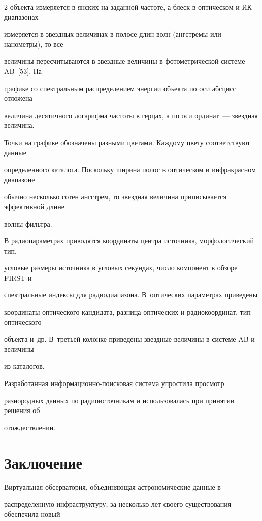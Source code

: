 \begin{multicols}{2}
объекта измеряется в янских на заданной частоте, а блеск в оптическом и ИК диа\-па\-зо\-нах 

измеряется в звездных величинах в полосе длин волн (ангстремы или нанометры), то все 

величины пересчитываются в звездные величины в фотометрической системе AB~[53]. На 

графике со спектральным распределением энергии объекта по оси абсцисс отложена 

величина десятичного логарифма частоты в герцах, а по оси ординат~--- звездная величина. 

Точки на графике обозначены разными цветами. Каждому цвету соответствуют данные 

определенного каталога. Поскольку ширина полос в оптическом и инфракрасном диапазоне 

обычно несколько сотен ангстрем, то звездная величина приписывается эффективной длине 

волны фильтра. 

      

      В радиопараметрах приводятся координаты центра источника, морфологический тип, 

угловые размеры источника в угловых секундах, число компонент в обзоре FIRST и 

спектральные индексы для радиодиапазона. В~оптических параметрах приведены 

координаты оптического кандидата, разница оптических и радиокоординат, тип оптического 

объекта и~др. В~третьей колонке приведены звездные величины в сис\-те\-ме AB и величины 

из каталогов. 

      

      Разработанная ин\-фор\-ма\-ци\-он\-но-по\-иско\-вая сис\-те\-ма упростила просмотр 

разнородных данных по радиоисточникам и использовалась при принятии решения об 

отождествлении.

  

\section{Заключение}



      Виртуальная обсерватория, объединяющая астрономические данные в 

распределенную инфраструктуру, за несколько лет своего существования обеспечила новый 


\end{multicols}
